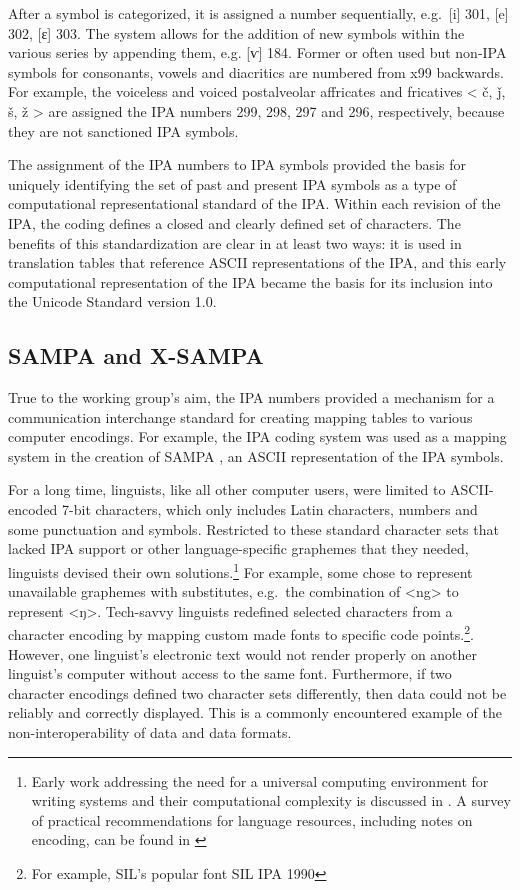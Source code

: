 After a symbol is categorized, it is assigned a number sequentially, 
e.g.\ [i] 301, [e] 302, [ɛ] 303. The system allows for the addition 
of new symbols within the various series by appending them, e.g. [ⱱ] 
184. Former or often used but non-IPA symbols for consonants, vowels 
and diacritics are numbered from x99 backwards. For example, the voiceless 
and voiced postalveolar affricates and fricatives < č, ǰ, š, ž > are 
assigned the IPA numbers 299, 298, 297 and 296, respectively, because 
they are not sanctioned IPA symbols.

The assignment of the IPA numbers to IPA symbols provided the basis for 
uniquely identifying the set of past and present IPA symbols as a type of 
computational representational standard of the IPA. Within each revision 
of the IPA, the coding defines a closed and clearly defined set of characters. 
The benefits of this standardization are clear in at least two ways: it is 
used in translation tables that reference ASCII representations of the IPA, 
and this early computational representation of the IPA became the basis for 
its inclusion into the Unicode Standard version 1.0.

\subsection{SAMPA and X-SAMPA}

True to the working group's aim, the IPA numbers provided a mechanism for 
a communication interchange standard for creating mapping tables to various 
computer encodings. For example, the IPA coding system was used as a mapping 
system in the creation of SAMPA \citep{Wells_etal1992}, an ASCII representation 
of the IPA symbols. 

For a long time, linguists, like all other computer users, were
limited to ASCII-encoded 7-bit characters, which only includes Latin characters,
numbers and some punctuation and symbols. Restricted to these standard character
sets that lacked IPA support or other language-specific graphemes that they
needed, linguists devised their own solutions.\footnote{Early work addressing
the need for a universal computing environment for writing systems and their
computational complexity is discussed in \citet{Simons1989}. A survey of
practical recommendations for language resources, including notes on encoding,
can be found in \citet{BirdSimons2003}} For example, some chose to represent
unavailable graphemes with substitutes, e.g.~the combination of <ng> to
represent <ŋ>. Tech-savvy linguists redefined selected characters from a
character encoding by mapping custom made fonts to specific code points.\footnote{For 
example, SIL's popular font SIL IPA 1990}. However,
one linguist's electronic text would not render properly on another linguist's
computer without access to the same font. Furthermore, if two character encodings
defined two character sets differently, then data could not be reliably and
correctly displayed. This is a commonly encountered example of the non-interoperability of
data and data formats.

